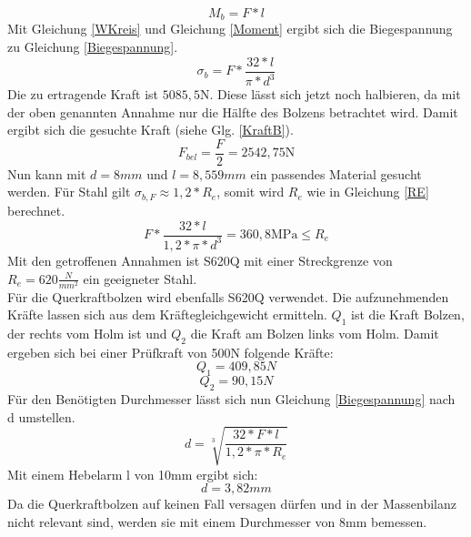  \begin{equation}
 \label{Moment}
 	M_{b}=F*l
 \end{equation}
 Mit Gleichung \ref{WKreis} und Gleichung \ref{Moment} ergibt sich die Biegespannung zu Gleichung \ref{Biegespannung}.
 \begin{equation}
 \label{Biegespannung}
 	\sigma_{b}=F*\frac{32*l}{\pi*d^{3}}
 \end{equation}
Die zu ertragende Kraft ist $5085,5 \mathrm{N}$. Diese lässt sich jetzt noch halbieren, da mit der oben genannten Annahme nur die Hälfte des Bolzens betrachtet wird. Damit ergibt sich die gesuchte Kraft (siehe Glg. \ref{KraftB}).
 \begin{equation}
 \label{KraftB}
 	F_{bel}=\frac{F}{2} =2542,75 \mathrm{N}
 \end{equation}
 Nun kann mit $d=8mm$ und $l=8,559mm$ ein passendes Material gesucht werden. Für Stahl gilt $\sigma_{b,F}\approx1,2*R_{e}$, somit wird $R_{e}$ wie in Gleichung \ref{RE} berechnet. 
 \begin{equation}
 \label{RE}
 	F*\frac{32*l}{1,2*\pi*d^{3}}=360,8\mathrm{MPa}\leq
R_{e} \end{equation}  
\noindent
Mit den getroffenen Annahmen ist S620Q mit einer Streckgrenze von $R_{e}=620\frac{N}{mm^{2}}$ ein geeigneter Stahl.\\
\noindent
Für die Querkraftbolzen wird ebenfalls S620Q verwendet. Die aufzunehmenden Kräfte lassen sich aus dem Kräftegleichgewicht ermitteln. $Q_{1}$ ist die Kraft Bolzen, der rechts vom Holm ist und $Q_{2}$ die Kraft am Bolzen links vom Holm. Damit ergeben sich bei einer Prüfkraft von 500N folgende Kräfte:
$$Q_{1}=409,85N$$
$$Q_{2}=90,15N$$
Für den Benötigten Durchmesser lässt sich nun Gleichung \ref{Biegespannung} nach d umstellen.
\begin{equation}
d=\sqrt[3]{\frac{32*F*l}{1,2*\pi*R_{e}}}
\end{equation}
Mit einem Hebelarm l von 10mm ergibt sich:
\begin{equation}
d=3,82mm
\end{equation}
Da die Querkraftbolzen auf keinen Fall versagen dürfen und in der Massenbilanz nicht relevant sind, werden sie mit einem Durchmesser von 8mm bemessen.\cite{item6}\\
 
 
 
 
  
 
